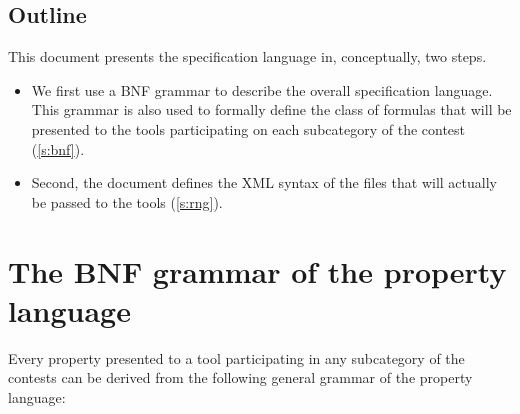 \documentclass[10pt,english,a4paper]{article}
\makeatletter
\newcommand{\mcc}[0]{MCC}
\newcommand{\mccl}[0]{Model Checking Contest @ Petri Nets}
\newcommand\mysection[1]{\color{sectioncolor}\section{#1}\color{defaultcolor}}
\newcommand\mysubsection[1]{\color{sectioncolor}\subsection{#1}\color{defaultcolor}}
\makeatother
\begin{document}

\mysubsection{Outline}

This document presents the specification language in, conceptually, two steps.
\begin{itemize}
\item
  We first use a BNF grammar to describe the overall specification
  language.  This grammar is also used to formally define the class of
  formulas that will be presented to the tools participating on each
  subcategory of the contest (\cref{s:bnf}).
\item
  Second, the document defines the XML syntax of the files that will
  actually be passed to the tools (\cref{s:rng}).
\end{itemize}


\mysection{The BNF grammar of the property language}
\label{s:bnf}

Every property presented to a tool participating in any subcategory of the
contests can be derived from the following general grammar of the
property language:
\end{document}

